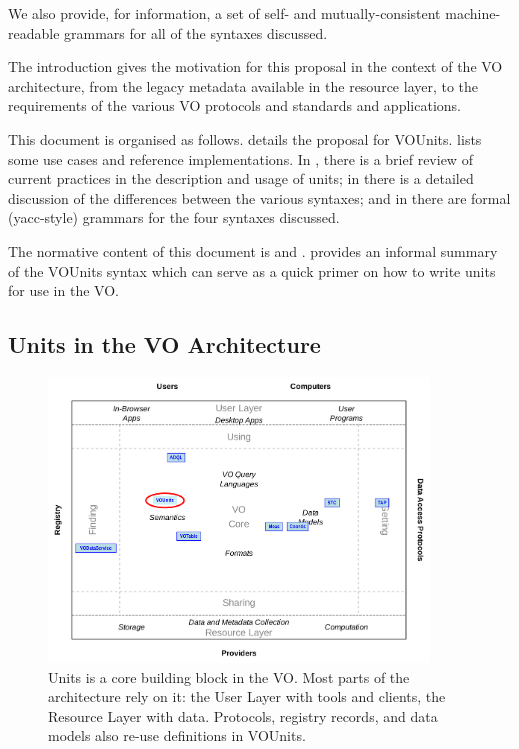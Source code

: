 \documentclass[11pt,a4paper]{ivoa}
\begin{document}
We also provide, for information, a set of self- and mutually-consistent
machine-readable grammars for all of the syntaxes discussed.

The introduction gives the motivation for
this proposal in the context of the VO architecture, from the legacy
metadata available in the resource layer, to the requirements of the various
VO protocols and standards and applications.

This document is organised as follows. 
details the proposal for VOUnits.  lists some
use cases and reference implementations.  In ,
there is a brief review of current practices in the description and
usage of units; in  there is a detailed
discussion of the differences between the various syntaxes; and
in  there are formal (yacc-style) grammars for
the four syntaxes discussed.

The normative content of this document is  and .
 provides an informal summary of the VOUnits
syntax which can serve as a quick primer on how to write units for use
in the VO.

\subsection{Units in the VO Architecture}

\renewcommand{\topfraction}{.85}
\renewcommand{\bottomfraction}{.7}
\renewcommand{\textfraction}{.15}
\renewcommand{\floatpagefraction}{.66}

\begin{figure}
\centering

\includegraphics[width=0.9\textwidth]{role_diagram.pdf}
  \caption{Units is a core building block in the VO.  Most parts of the
  architecture rely on it: the User Layer with tools and clients, the
  Resource Layer with data.  Protocols, registry records, and
  data models also re-use definitions in VOUnits.}
  \label{fig:architecture}
\end{figure}
\end{document}
